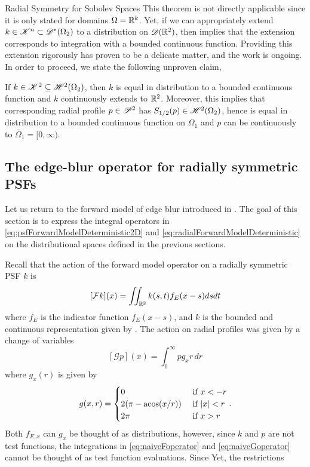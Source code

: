 \begin{chapter}{Radial Symmetry for Sobolev Spaces}
This theorem is not directly applicable since it is only stated for domains $\Omega = \mathbb R^k$.
Yet, if we can appropriately extend $k \in \mathscr K^n \subset \mathscr D^*(\Omega_2)$ to a distribution on $\mathscr D(\mathbb R^2)$, then  implies that the extension corresponds to integration with a bounded continuous function.
Providing this extension rigorously has proven to be a delicate matter, and the work is ongoing.
In order to proceed, we state the following unproven claim,

\begin{claim} \label{claim:pspace}
  If $k \in \mathscr K^2 \subseteq \mathscr H^2(\Omega_2)$, then $k$ is equal in distribution to a bounded continuous function and $k$ continuously extends to $\mathbb R^2$. 
  Moreover, this implies that corresponding radial profile $p \in \mathscr P^2$ has $S_{1/2}(p) \in \mathscr H^2(\Omega_2)$, hence is equal in distribution to a bounded continuous function on $\Omega_1$ and $p$ can be continuously to $\bar \Omega_1 = [0,\infty)$.
\end{claim}

\begin{com}
\subsection{The edge-blur operator for radially symmetric PSFs}
Let us return to the forward model of edge blur introduced in .
The goal of this section is to express the integral operators in \eqref{eq:psfForwardModelDeterministic2D} and \eqref{eq:radialForwardModelDeterministic} on the distributional spaces defined in the previous sections.

Recall that the action of the forward model operator on a radially symmetric PSF $k$ is
\begin{equation} \label{eq:naiveFoperator}
  [\mathcal F k](x) = \iint_{\mathbb R^2} k(s,t) f_{E}(x-s) dsdt
\end{equation}
where $f_{E}$ is the indicator function $f_E(x-s)$, and $k$ is the bounded and continuous representation given by .
The action on radial profiles was given by a change of variables
\begin{equation}\label{eq:naiveGoperator}
    [\mathcal Gp](x) = \int_0^\infty p g_x r\,dr
\end{equation}
where $g_x(r)$ is given by
\begin{equation} 
  g(x,r) = \begin{cases}
    0 &\text{ if } x < - r\\
    2(\pi - \operatorname*{acos}(x/r)) &\text{ if } |x| < r\\
    2\pi & \text{ if } x> r
  \end{cases}.
  \label{g_form}
\end{equation}
Both $f_{E,x}$ can $g_x$ be thought of as distributions, however, since $k$ and $p$ are not test functions, the integrations in \eqref{eq:naiveFoperator} and \eqref{eq:naiveGoperator} cannot be thought of as test function evaluations.
Since 
Yet, the restrictions 



\end{com}
\end{chapter}
